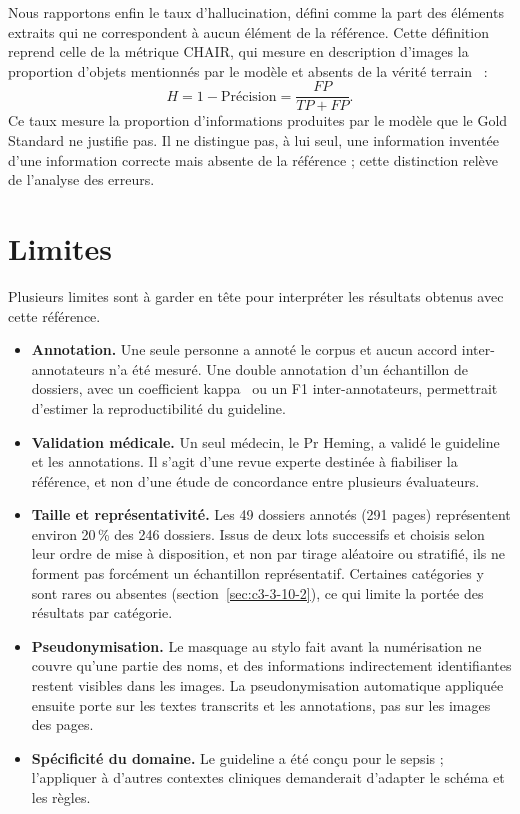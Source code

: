 Nous rapportons enfin le taux d'hallucination, défini comme la part des éléments extraits qui ne correspondent à aucun élément de la référence. Cette définition reprend celle de la métrique CHAIR, qui mesure en description d'images la proportion d'objets mentionnés par le modèle et absents de la vérité terrain~\cite{rohrbach2018chair} :
\begin{equation}
H = 1 - \text{Précision} = \frac{FP}{TP + FP}.
\end{equation}
Ce taux mesure la proportion d'informations produites par le modèle que le Gold Standard ne justifie pas. Il ne distingue pas, à lui seul, une information inventée d'une information correcte mais absente de la référence ; cette distinction relève de l'analyse des erreurs.

\section{Limites}\label{sec:c3-3-12}

Plusieurs limites sont à garder en tête pour interpréter les résultats obtenus avec cette référence.

\begin{itemize}
  \item \textbf{Annotation.} Une seule personne a annoté le corpus et aucun accord inter-annotateurs n’a été mesuré. Une double annotation d’un échantillon de dossiers, avec un coefficient kappa~\cite{cohen1960} ou un F1 inter-annotateurs, permettrait d’estimer la reproductibilité du guideline.
  \item \textbf{Validation médicale.} Un seul médecin, le Pr Heming, a validé le guideline et les annotations. Il s’agit d’une revue experte destinée à fiabiliser la référence, et non d’une étude de concordance entre plusieurs évaluateurs.
  \item \textbf{Taille et représentativité.} Les 49 dossiers annotés (291 pages) représentent environ 20\,\% des 246 dossiers. Issus de deux lots successifs et choisis selon leur ordre de mise à disposition, et non par tirage aléatoire ou stratifié, ils ne forment pas forcément un échantillon représentatif. Certaines catégories y sont rares ou absentes (section~\ref{sec:c3-3-10-2}), ce qui limite la portée des résultats par catégorie.
  \item \textbf{Pseudonymisation.} Le masquage au stylo fait avant la numérisation ne couvre qu’une partie des noms, et des informations indirectement identifiantes restent visibles dans les images. La pseudonymisation automatique appliquée ensuite porte sur les textes transcrits et les annotations, pas sur les images des pages.
  \item \textbf{Spécificité du domaine.} Le guideline a été conçu pour le sepsis ; l’appliquer à d’autres contextes cliniques demanderait d’adapter le schéma et les règles.
\end{itemize}

